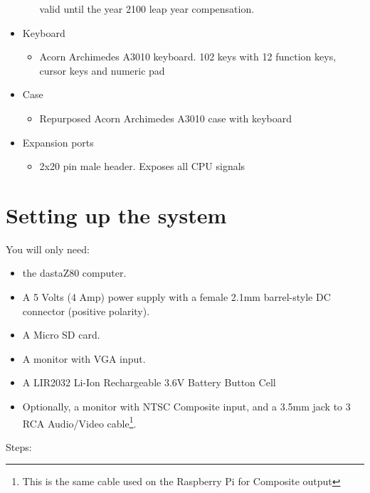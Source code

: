 \documentclass[a4paper,11pt]{article}
\begin{document}
\begin{itemize}
\begin{itemize}
            valid until the year 2100 leap year compensation.
        \end{itemize}
        \item Keyboard
        \begin{itemize}
            \item Acorn Archimedes A3010 keyboard. 102 keys with 12 function
            keys, cursor keys and numeric pad
        \end{itemize}
        \item Case
        \begin{itemize}
            \item Repurposed Acorn Archimedes A3010 case with keyboard
        \end{itemize}
        \item Expansion ports
        \begin{itemize}
            \item 2x20 pin male header. Exposes all CPU signals
        \end{itemize}
    \end{itemize}

    \pagebreak
    \section{Setting up the system}
    \label{sec:setting_system}
    You will only need:

    \begin{itemize}
        \item the dastaZ80 computer.
        \item A 5 Volts (4 Amp) power supply with a female 2.1mm barrel-style DC
        connector (positive polarity).
        \item A Micro SD card.
        \item A monitor with VGA input.
        \item A LIR2032 Li-Ion Rechargeable 3.6V Battery Button Cell
        \item Optionally, a monitor with NTSC Composite input, and a 3.5mm jack
        to 3 RCA Audio/Video cable\footnote{This is the same cable used on the
        Raspberry Pi for Composite output}.
    \end{itemize}

    Steps:
\end{document}

